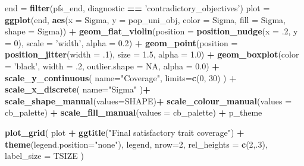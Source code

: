 \documentclass[]{book}
\newenvironment{Shaded}{\begin{snugshade}}{\end{snugshade}}
\newcommand{\DataTypeTok}[1]{\textcolor[rgb]{0.13,0.29,0.53}{#1}}
\newcommand{\DecValTok}[1]{\textcolor[rgb]{0.00,0.00,0.81}{#1}}
\newcommand{\FloatTok}[1]{\textcolor[rgb]{0.00,0.00,0.81}{#1}}
\newcommand{\KeywordTok}[1]{\textcolor[rgb]{0.13,0.29,0.53}{\textbf{#1}}}
\newcommand{\NormalTok}[1]{#1}
\newcommand{\OperatorTok}[1]{\textcolor[rgb]{0.81,0.36,0.00}{\textbf{#1}}}
\newcommand{\OtherTok}[1]{\textcolor[rgb]{0.56,0.35,0.01}{#1}}
\newcommand{\StringTok}[1]{\textcolor[rgb]{0.31,0.60,0.02}{#1}}
\begin{document}
\begin{Shaded}
\begin{Highlighting}[]
\NormalTok{end =}\StringTok{ }\KeywordTok{filter}\NormalTok{(pfs_end, diagnostic }\OperatorTok{==}\StringTok{ 'contradictory_objectives'}\NormalTok{)}
\NormalTok{plot =}\StringTok{ }\KeywordTok{ggplot}\NormalTok{(end, }\KeywordTok{aes}\NormalTok{(}\DataTypeTok{x =}\NormalTok{ Sigma, }\DataTypeTok{y =}\NormalTok{ pop_uni_obj, }\DataTypeTok{color =}\NormalTok{ Sigma, }\DataTypeTok{fill =}\NormalTok{ Sigma, }\DataTypeTok{shape =}\NormalTok{ Sigma)) }\OperatorTok{+}
\StringTok{  }\KeywordTok{geom_flat_violin}\NormalTok{(}\DataTypeTok{position =} \KeywordTok{position_nudge}\NormalTok{(}\DataTypeTok{x =} \FloatTok{.2}\NormalTok{, }\DataTypeTok{y =} \DecValTok{0}\NormalTok{), }\DataTypeTok{scale =} \StringTok{'width'}\NormalTok{, }\DataTypeTok{alpha =} \FloatTok{0.2}\NormalTok{) }\OperatorTok{+}
\StringTok{  }\KeywordTok{geom_point}\NormalTok{(}\DataTypeTok{position =} \KeywordTok{position_jitter}\NormalTok{(}\DataTypeTok{width =} \FloatTok{.1}\NormalTok{), }\DataTypeTok{size =} \FloatTok{1.5}\NormalTok{, }\DataTypeTok{alpha =} \FloatTok{1.0}\NormalTok{) }\OperatorTok{+}
\StringTok{  }\KeywordTok{geom_boxplot}\NormalTok{(}\DataTypeTok{color =} \StringTok{'black'}\NormalTok{, }\DataTypeTok{width =} \FloatTok{.2}\NormalTok{, }\DataTypeTok{outlier.shape =} \OtherTok{NA}\NormalTok{, }\DataTypeTok{alpha =} \FloatTok{0.0}\NormalTok{) }\OperatorTok{+}
\StringTok{  }\KeywordTok{scale_y_continuous}\NormalTok{(}
    \DataTypeTok{name=}\StringTok{"Coverage"}\NormalTok{,}
    \DataTypeTok{limits=}\KeywordTok{c}\NormalTok{(}\DecValTok{0}\NormalTok{, }\DecValTok{30}\NormalTok{)}
\NormalTok{  ) }\OperatorTok{+}
\StringTok{  }\KeywordTok{scale_x_discrete}\NormalTok{(}
    \DataTypeTok{name=}\StringTok{"Sigma"}
\NormalTok{  )}\OperatorTok{+}
\StringTok{  }\KeywordTok{scale_shape_manual}\NormalTok{(}\DataTypeTok{values=}\NormalTok{SHAPE)}\OperatorTok{+}
\StringTok{  }\KeywordTok{scale_colour_manual}\NormalTok{(}\DataTypeTok{values =}\NormalTok{ cb_palette) }\OperatorTok{+}
\StringTok{  }\KeywordTok{scale_fill_manual}\NormalTok{(}\DataTypeTok{values =}\NormalTok{ cb_palette) }\OperatorTok{+}
\StringTok{  }\NormalTok{p_theme}

\KeywordTok{plot_grid}\NormalTok{(}
\NormalTok{  plot }\OperatorTok{+}
\StringTok{    }\KeywordTok{ggtitle}\NormalTok{(}\StringTok{"Final satisfactory trait coverage"}\NormalTok{) }\OperatorTok{+}
\StringTok{    }\KeywordTok{theme}\NormalTok{(}\DataTypeTok{legend.position=}\StringTok{"none"}\NormalTok{),}
\NormalTok{  legend,}
  \DataTypeTok{nrow=}\DecValTok{2}\NormalTok{,}
  \DataTypeTok{rel_heights =} \KeywordTok{c}\NormalTok{(}\DecValTok{2}\NormalTok{,.}\DecValTok{3}\NormalTok{),}
  \DataTypeTok{label_size =}\NormalTok{ TSIZE}
\NormalTok{)}
\end{Highlighting}
\end{Shaded}
\end{document}

